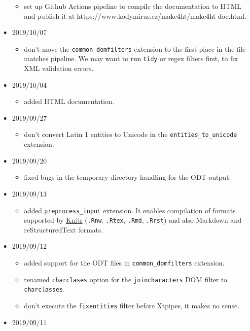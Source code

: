 \begin{itemize}
  \begin{itemize}
  \tightlist
  \item
    set up Github Actions pipeline to compile the documentation to HTML
    and publish it at https://www.kodymirus.cz/make4ht/make4ht-doc.html.
  \end{itemize}
\item
  2019/10/07

  \begin{itemize}
  \tightlist
  \item
    don't move the \texttt{common\_domfilters} extension to the first
    place in the file matches pipeline. We may want to run \texttt{tidy}
    or regex filters first, to fix XML validation errors.
  \end{itemize}
\item
  2019/10/04

  \begin{itemize}
  \tightlist
  \item
    added HTML documentation.
  \end{itemize}
\item
  2019/09/27

  \begin{itemize}
  \tightlist
  \item
    don't convert Latin 1 entities to Unicode in the
    \texttt{entities\_to\_unicode} extension.
  \end{itemize}
\item
  2019/09/20

  \begin{itemize}
  \tightlist
  \item
    fixed bugs in the temporary directory handling for the ODT output.
  \end{itemize}
\item
  2019/09/13

  \begin{itemize}
  \tightlist
  \item
    added \texttt{preprocess\_input} extension. It enables compilation
    of formats supported by \href{https://yihui.name/knitr/}{Knitr}
    (\texttt{.Rnw}, \texttt{.Rtex}, \texttt{.Rmd}, \texttt{.Rrst}) and
    also Markdown and reStructuredText formats.
  \end{itemize}
\item
  2019/09/12

  \begin{itemize}
  \tightlist
  \item
    added support for the ODT files in \texttt{common\_domfilters}
    extension.
  \item
    renamed \texttt{charclases} option for the \texttt{joincharacters}
    DOM filter to \texttt{charclasses}.
  \item
    don't execute the \texttt{fixentities} filter before Xtpipes, it
    makes no sense.
  \end{itemize}
\item
  2019/09/11


\end{itemize}
